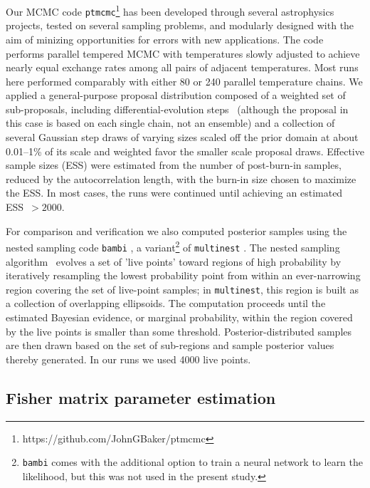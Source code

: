 \documentclass[aps,showpacs,twocolumn,prd,superscriptaddress,nofootinbib]{revtex4-1}
\begin{document}
Our MCMC code \texttt{ptmcmc}\footnote{https://github.com/JohnGBaker/ptmcmc} has been developed through several astrophysics projects, tested on several sampling problems, and modularly designed with the aim of minizing opportunities for errors with new applications. The code performs parallel tempered MCMC \cite{SwendsenWang86, LittenbergCornish09} with temperatures slowly adjusted to achieve nearly equal exchange rates among all pairs of adjacent temperatures.  Most runs here performed comparably with either 80 or 240 parallel temperature chains.
We applied a general-purpose proposal distribution composed of a weighted set of sub-proposals, including differential-evolution steps~\cite{Braak06, BraakVrugt08} (although the proposal in this case is based on each single chain, not an ensemble) and a collection of several Gaussian step draws of varying sizes scaled off the prior domain at about 0.01--1\% of its scale and weighted favor the smaller scale proposal draws.
Effective sample sizes (ESS) were estimated from the number of post-burn-in samples, reduced by the autocorrelation length, with the burn-in size chosen to maximize the ESS. In most cases, the runs were continued until achieving an estimated ESS~$>2000$.

For comparison and verification we also computed posterior samples using the nested sampling code \texttt{bambi} \cite{Graff+11}, a variant\footnote{\texttt{bambi} comes with the additional option to train a neural network to learn the likelihood, but this was not used in the present study.} of \texttt{multinest} \cite{Feroz+09}. The nested sampling algorithm~\cite{Skilling06} evolves a set of 'live points' toward regions of high probability by iteratively resampling the lowest probability point from within an ever-narrowing region covering the set of live-point samples; in \texttt{multinest}, this region is built as a collection of overlapping ellipsoids. The computation proceeds until the estimated Bayesian evidence, or marginal probability, within the region covered by the live points is smaller than some threshold. Posterior-distributed samples are then drawn based on the set of sub-regions and sample posterior values thereby generated. In our runs we used 4000 live points.



\subsection{Fisher matrix parameter estimation}
\label{subsec:Fisher}
\end{document}
